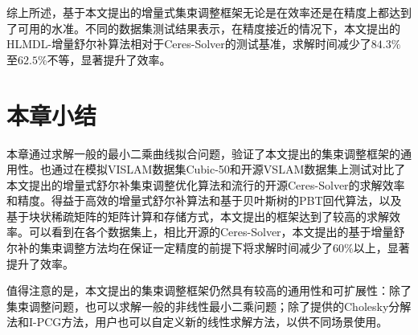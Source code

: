 综上所述，基于本文提出的增量式集束调整框架无论是在效率还是在精度上都达到了可用的水准。不同的数据集测试结果表示，在精度接近的情况下，本文提出的HLMDL-增量舒尔补算法相对于Ceres-Solver的测试基准，求解时间减少了$84.3\%$至$62.5\%$不等，显著提升了效率。

\section{本章小结}

本章通过求解一般的最小二乘曲线拟合问题，验证了本文提出的集束调整框架的通用性。也通过在模拟VISLAM数据集Cubic-50和开源VSLAM数据集上测试对比了本文提出的增量式舒尔补集束调整优化算法和流行的开源Ceres-Solver的求解效率和精度。得益于高效的增量式舒尔补算法和基于贝叶斯树的PBT回代算法，以及基于块状稀疏矩阵的矩阵计算和存储方式，本文提出的框架达到了较高的求解效率。可以看到在各个数据集上，相比开源的Ceres-Solver，本文提出的基于增量舒尔补的集束调整方法均在保证一定精度的前提下将求解时间减少了$60\%$以上，显著提升了效率。

值得注意的是，本文提出的集束调整框架仍然具有较高的通用性和可扩展性：除了集束调整问题，也可以求解一般的非线性最小二乘问题；除了提供的Cholesky分解法和I-PCG方法，用户也可以自定义新的线性求解方法，以供不同场景使用。
